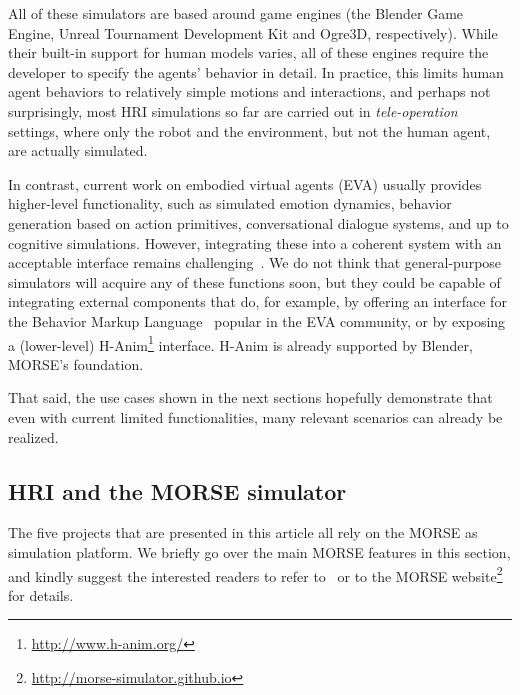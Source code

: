 \documentclass[letterpaper, 10pt, conference]{ieeeconf}
\begin{document}
All of these simulators are based around game engines (the Blender Game Engine,
Unreal Tournament Development Kit and Ogre3D, respectively). While their
built-in support for human models varies, all of these engines require the
developer to specify the agents' behavior in detail. In practice, this limits
human agent behaviors to relatively simple motions and interactions, and perhaps
not surprisingly, most HRI simulations so far are carried out in
\emph{tele-operation} settings, where only the robot and the environment, but
not the human agent, are actually simulated.

In contrast, current work on embodied virtual agents (EVA) usually provides 
higher-level functionality, such as simulated emotion dynamics, behavior 
generation based on action primitives, conversational dialogue systems, and
up to cognitive simulations. However, integrating these into a coherent 
system with an acceptable interface remains 
challenging~\cite{gratch2002creating}. We do not think that general-purpose
simulators will acquire any of these functions soon, but they could be
capable of integrating external components that do, for example, by offering 
an interface for the Behavior Markup Language~\cite{kopp2006towards} popular
in the EVA community, or by exposing a (lower-level) 
H-Anim\footnote{\url{http://www.h-anim.org/}} interface. H-Anim is already
supported by Blender, MORSE's foundation.

That said, the use cases shown in the next sections hopefully demonstrate that
even with current limited functionalities, many relevant scenarios can already
be realized.


\subsection*{HRI and the MORSE simulator}

The five projects that are presented in this article all rely on the MORSE as
simulation platform. We briefly go over the main MORSE features in this section,
and kindly suggest the interested readers to refer to~\cite{morse_simpar_2012}
or to the MORSE website\footnote{\url{http://morse-simulator.github.io}} for
details.
\end{document}
